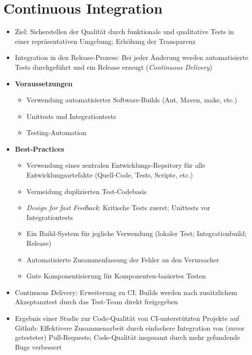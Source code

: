 \section{Continuous Integration}
\begin{itemize}
	\item Ziel: Sicherstellen der Qualität durch funktionale und qualitative Tests in einer repräsentativen Umgebung; Erhöhung der Transparenz
	\item Integration in den Release-Prozess: Bei jeder Änderung werden automatisierte Tests durchgeführt und ein Release erzeugt (\textit{Continuous Delivery})
	\item \textbf{Voraussetzungen}
	\begin{itemize}
		\item Verwendung automatisierter Software-Builds (Ant, Maven, make, etc.)
		\item Unittests und Integrationtests
		\item Testing-Automation
	\end{itemize}
	\item \textbf{Best-Practices}
	\begin{itemize}
		\item Verwendung eines zentralen Entwicklungs-Repsitory für alle Entwicklungsartefakte (Quell-Code, Tests, Scripte, etc.)
		\item Vermeidung duplizierten Test-Codebasis
		\item \textit{Design for fast Feedback}: Kritische Tests zuerst; Unittests vor Integrationtests
		\item Ein Build-System für jegliche Verwendung (lokaler Test; Integrationbuild; Release)
		\item Automatisierte Zusammenfassung der Fehler an den Verursacher
		\item Gute Komponentisierung für Komponenten-basiertes Testen
	\end{itemize}
	\item Continuous Delivery: Erweiterung zu CI; Builds werden nach zusätzlichem Akzeptanztest durch das Test-Team direkt freigegeben
	\item Ergebnis einer Studie zur Code-Qualität von CI-unterstützten Projekte auf Github: Effektivere Zusammenarbeit durch einfachere Integration von (zuvor getesteter) Pull-Requests; Code-Qualität insgesamt durch mehr gefundende Bugs verbessert
\end{itemize}



